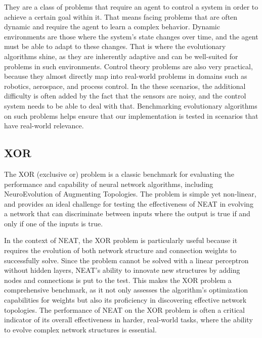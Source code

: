 \documentclass{article}
\begin{document}
    They are a class of problems that require an agent to control a system in order to achieve
    a certain goal within it.
    That means facing problems that are often dynamic and require the agent to learn a complex behavior. 
    Dynamic environments are those where the system's state changes over time, and the agent must be able to adapt to these changes.
    That is where the evolutionary algorithms shine, as they are inherently adaptive and can be well-suited for problems in such environments.
    Control theory problems are also very practical, because they almost directly map into real-world problems in domains such as robotics,
    aerospace, and process control. In the these scenarios, the additional difficulty is often added by the fact
    that the sensors are noisy, and the control system needs to be able to deal with that. 
    Benchmarking evolutionary algorithms on such problems helps ensure that our implementation
    is tested in scenarios that have real-world relevance.
    
        \subsection{XOR}
        The XOR (exclusive or) problem is a classic benchmark for evaluating the performance and capability of neural network algorithms,
        including NeuroEvolution of Augmenting Topologies.
        The problem is simple yet non-linear, and provides an ideal challenge for testing the effectiveness of NEAT in evolving
        a network that can discriminate between inputs where the output is true if and only if one of the inputs is true.

        \par In the context of NEAT, the XOR problem is particularly useful because it requires the evolution
        of both network structure and connection weights to successfully solve. Since the problem cannot
        be solved with a linear perceptron without hidden layers, NEAT's ability to innovate new structures by adding nodes and
        connections is put to the test. This makes the XOR problem a comprehensive benchmark,
        as it not only assesses the algorithm's optimization capabilities for weights but also its proficiency in discovering
        effective network topologies. The performance of NEAT on the XOR problem is often a critical
        indicator of its overall effectiveness in harder, real-world tasks,
        where the ability to evolve complex network structures is essential.
\end{document}
